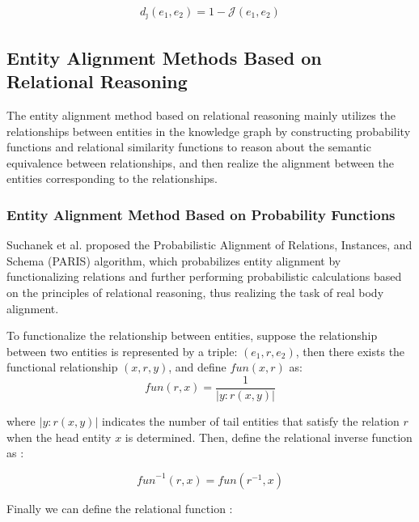 \documentclass[sigconf]{acmart}
\begin{document}
{\begin{equation}
    \begin{array}{c}
         d_{\jmath}\left(e_{1}, e_{2}\right)=1-\mathcal{J}\left(e_{1}, e_{2}\right)
    \end{array}
\end{equation}

\subsection{Entity Alignment Methods Based on Relational Reasoning}

The entity alignment method based on relational reasoning mainly utilizes the relationships between entities in the knowledge graph by constructing probability functions \cite{suchanek2011paris} and relational similarity functions \cite{lacoste2013sigma} to reason about the semantic equivalence between relationships, and then realize the alignment between the entities corresponding to the relationships.

\subsubsection{Entity Alignment Method Based on Probability Functions}

Suchanek et al. \cite{suchanek2011paris} proposed the Probabilistic Alignment of Relations, Instances, and Schema (PARIS) algorithm, which probabilizes entity alignment by functionalizing relations and further performing probabilistic calculations based on the principles of relational reasoning, thus realizing the task of real body alignment.

To functionalize the relationship between entities, suppose the relationship between two entities is represented by a triple: $(e_1,r,e_2)$, then there exists the functional relationship $(x,r,y)$, and define $fun(x,r)$ as:
\begin{equation}
    \textit{fun}(r, x)=\frac{1}{|y: r(x, y)|}
\end{equation}

where $|y:r(x,y)|$ indicates the number of tail entities that satisfy the relation $r$ when the head entity $x$ is determined. 
Then, define the relational inverse function as :

\begin{equation}
    \textit{}{fun}^{-1}(r, x)=\textit{}{fun}\left(r^{-1}, x\right)
\end{equation}

Finally we can define the relational function :

}
\end{document}
